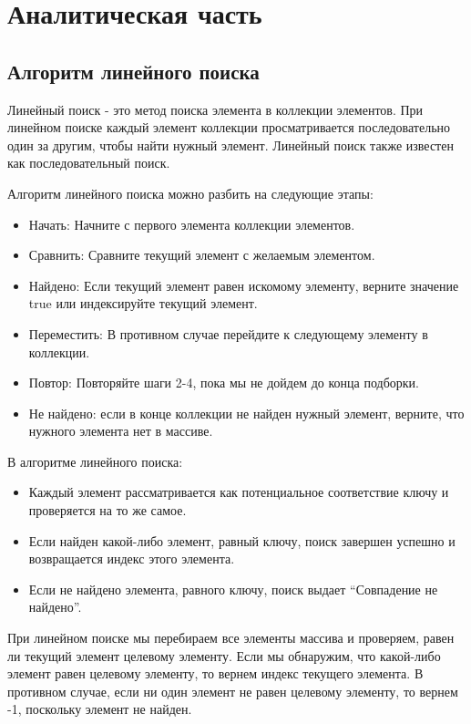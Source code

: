 \section{Аналитическая часть}

\subsection{Алгоритм линейного поиска}

\hspace{1.25cm}
Линейный поиск - это метод поиска элемента в коллекции элементов. При линейном поиске каждый элемент коллекции просматривается последовательно один за другим, чтобы найти нужный элемент. Линейный поиск также известен как последовательный поиск.

Алгоритм линейного поиска можно разбить на следующие этапы:
\begin{itemize}
\item Начать: Начните с первого элемента коллекции элементов.
\item Сравнить: Сравните текущий элемент с желаемым элементом.
\item Найдено: Если текущий элемент равен искомому элементу, верните значение true или индексируйте текущий элемент.
\item Переместить: В противном случае перейдите к следующему элементу в коллекции.
\item Повтор: Повторяйте шаги 2-4, пока мы не дойдем до конца подборки.
\item Не найдено: если в конце коллекции не найден нужный элемент, верните, что нужного элемента нет в массиве.
\end{itemize}

В алгоритме линейного поиска:
\begin{itemize}
\item Каждый элемент рассматривается как потенциальное соответствие ключу и проверяется на то же самое.
\item Если найден какой-либо элемент, равный ключу, поиск завершен успешно и возвращается индекс этого элемента.
\item Если не найдено элемента, равного ключу, поиск выдает “Совпадение не найдено”.
\end{itemize}

При линейном поиске мы перебираем все элементы массива и проверяем, равен ли текущий элемент целевому элементу. Если мы обнаружим, что какой-либо элемент равен целевому элементу, то вернем индекс текущего элемента. В противном случае, если ни один элемент не равен целевому элементу, то вернем -1, поскольку элемент не найден.

